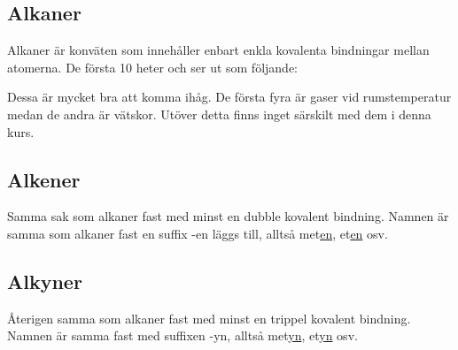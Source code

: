 \subsection{Alkaner}
Alkaner är konväten som innehåller enbart enkla kovalenta bindningar mellan atomerna. De första 10 heter och ser ut som följande:
\begin{center}
\end{center}
Dessa är mycket bra att komma ihåg. De första fyra är gaser vid rumstemperatur medan de andra är vätskor. Utöver detta finns inget särskilt med dem i denna kurs.

\subsection{Alkener}
Samma sak som alkaner fast med minst en dubble kovalent bindning. Namnen är samma som alkaner fast en suffix -en läggs till, alltså met\underline{en}, et\underline{en} osv.

\subsection{Alkyner}
Återigen samma som alkaner fast med minst en trippel kovalent bindning. Namnen är samma fast med suffixen -yn, alltså met\underline{yn}, et\underline{yn} osv.

